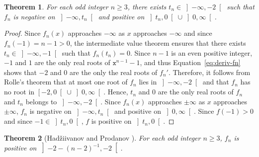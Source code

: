 \documentclass[12pt]{article}
\newcommand{\ttx}{\mathtt{x}}
\newtheorem{theorem}{Theorem}
\begin{document}
 
 \begin{theorem} \label{thm:n-is-odd}
   For each odd integer $n \ge 3$,
   there exists $t_n \in \left] - \infty, - 2 \right[$ such that $f_n$ is 
   negative on $\left]- \infty, t_n \right[$
   and
   positive on $\left]t_n, 0 \right[ \cup\left]0, \infty \right[$.
 \end{theorem} 

 \begin{proof}
   Since $f_n(x)$ approaches $- \infty$ as $x$ approaches $- \infty$ and
   since $f_n(- 1) = n - 1 > 0$,
   the intermediate value theorem ensures that there exists $t_n \in \left]- \infty, -1 \right[$ such that $f_n(t_n) = 0$. 
   Since $n - 1$ is an even positive integer,
   $- 1$ and $1$ are the only real roots of $\ttx^{n - 1} - 1$,
   and thus Equation~\eqref{eq:deriv-fn} shows that $- 2$ and $0$ are the only the real roots of $f_n'$.
   Therefore, it follows from Rolle's theorem that
   at most one root of $f_n$ lies in $\left]- \infty, - 2 \right[$ and that
   $f_n$ has no root in $\left[- 2, 0 \right[ \cup \left]0,  \infty \right[$.
   Hence, $t_n$ and $0$ are the only real roots of $f_n$ and $t_n$ belongs to $\left]- \infty, - 2 \right[$.
   Since $f_n(x)$ approaches $\pm \infty$ as $x$ approaches $\pm \infty$,
   $f_n$ is negative on $\left]- \infty, t_n \right[$ and positive on $\left]0, \infty \right[$.
   Since $f(- 1) > 0$ and since $- 1 \in \left]t_n, 0 \right[$,
   $f$ is positive on $\left]t_n, 0 \right[$. 
 \end{proof}
 
 \begin{theorem}[Had\v{z}iivanov and Prodanov \cite{MitrinovicAI}] \label{thm:bulgare}
   \label{lem:odd-two-roots}   
   For each odd integer $n \ge 3$,
   $f_n$ is positive on $\left]- 2 - {(n - 2)}^{- 1}, - 2 \right[$.
 \end{theorem}
\end{document}
